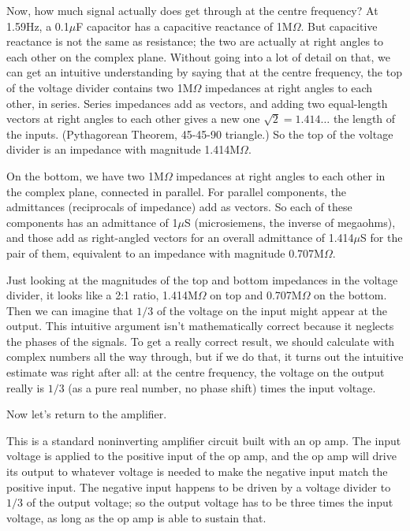 Now, how much signal actually does get through at the centre frequency?  At
1.59Hz, a 0.1$\mu$F capacitor has a capacitive reactance of 1M$\Omega$.  But
capacitive reactance is not the same as resistance; the two are actually at
right angles to each other on the complex plane.  Without going into a lot
of detail on that, we can get an intuitive understanding by saying that at
the centre frequency, the top of the voltage divider contains two 1M$\Omega$
impedances at right angles to each other, in series.  Series impedances add
as vectors, and adding two equal-length vectors at right angles to each
other gives a new one $\sqrt{2}=1.414\ldots$ the length of the inputs. 
(Pythagorean Theorem, 45-45-90 triangle.) So the top of the voltage divider
is an impedance with magnitude 1.414M$\Omega$.

On the bottom, we have two 1M$\Omega$ impedances at right angles to each
other in the complex plane, connected in parallel.  For parallel components,
the admittances (reciprocals of impedance) add as vectors.  So each of these
components has an admittance of 1$\mu$S (microsiemens, the inverse of
megaohms), and those add as right-angled vectors for an overall admittance
of 1.414$\mu$S for the pair of them, equivalent to an impedance with
magnitude 0.707M$\Omega$.

Just looking at the magnitudes of the top and bottom impedances in the
voltage divider, it looks like a 2:1 ratio, 1.414M$\Omega$ on top and
0.707M$\Omega$ on the bottom.  Then we can imagine that $1/3$ of the voltage
on the input might appear at the output.  This intuitive argument isn't
mathematically correct because it neglects the phases of the signals.  To
get a really correct result, we should calculate with complex numbers all
the way through, but if we do that, it turns out the intuitive estimate was
right after all: at the centre frequency, the voltage on the output really
is $1/3$ (as a pure real number, no phase shift) times the input voltage.

Now let's return to the amplifier.

{\centering\par}

This is a standard noninverting amplifier circuit built with an op amp.  The
input voltage is applied to the positive input of the op amp, and the op amp
will drive its output to whatever voltage is needed to make the negative
input match the positive input.  The negative input happens to be driven by
a voltage divider to $1/3$ of the output voltage; so the output voltage has
to be three times the input voltage, as long as the op amp is able to
sustain that.

